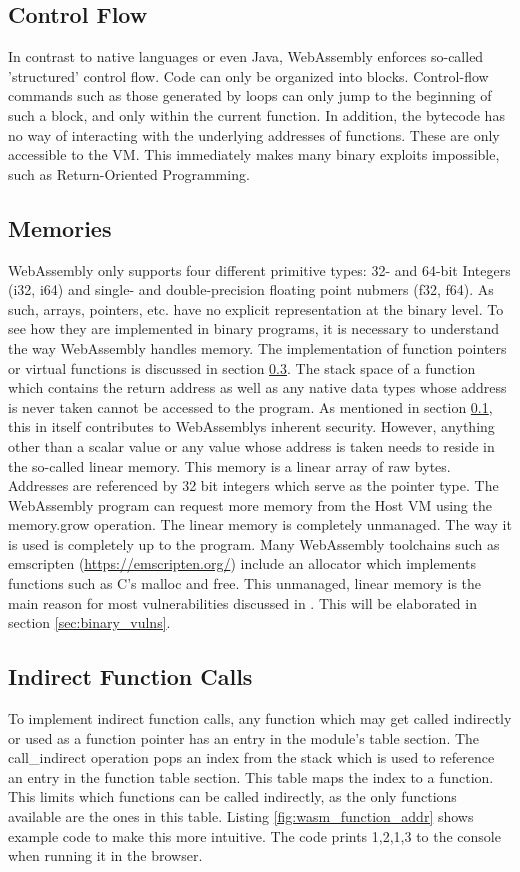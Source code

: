 \documentclass[sigconf]{acmart}
\begin{document}
\subsection{Control Flow}
\label{sec:wasm_control_flow}
In contrast to native languages or even Java, WebAssembly enforces so-called 'structured' control flow. Code can only be organized into blocks. Control-flow commands such as those generated by loops can only jump to the beginning of such a block, and only within the current function. In addition, the bytecode has no way of interacting with the underlying addresses of functions. These are only accessible to the VM. This immediately makes many binary exploits impossible, such as Return-Oriented Programming. 

\subsection{Memories} 
\label{sec:memories}
WebAssembly only supports four different primitive types: 32- and 64-bit Integers (i32, i64) and single- and double-precision floating point nubmers (f32, f64). As such, arrays, pointers, etc. have no explicit representation at the binary level. To see how they are implemented in binary programs, it is necessary to understand the way WebAssembly handles memory. The implementation of function pointers or virtual functions is discussed in section \ref{sec:indirect_calls}. The stack space of a function which contains the return address as well as any native data types whose address is never taken cannot be accessed to the program. As mentioned in section \ref{sec:wasm_control_flow}, this in itself contributes to WebAssemblys inherent security. However, anything other than a scalar value or any value whose address is taken needs to reside in the so-called linear memory. This memory is a linear array of raw bytes. Addresses are referenced by 32 bit integers which serve as the pointer type. The WebAssembly program can request more memory from the Host VM using the memory.grow operation. The linear memory is completely unmanaged. The way it is used is completely up to the program. Many WebAssembly toolchains such as emscripten (\url{https://emscripten.org/}) include an allocator which implements functions such as C's malloc and free. This unmanaged, linear memory is the main reason for most vulnerabilities discussed in \cite{lehmann_everything_2020}. This will be elaborated in section \ref{sec:binary_vulns}.

\subsection{Indirect Function Calls} 
\label{sec:indirect_calls}
To implement indirect function calls, any function which may get called indirectly or used as a function pointer has an entry in the module's table section. The call\_indirect operation pops an index from the stack which is used to reference an entry in the function table section. This table maps the index to a function. This limits which functions can be called indirectly, as the only functions available are the ones in this table. Listing \ref{fig:wasm_function_addr} shows example code to make this more intuitive. The code prints 1,2,1,3 to the console when running it in the browser.
\end{document}
